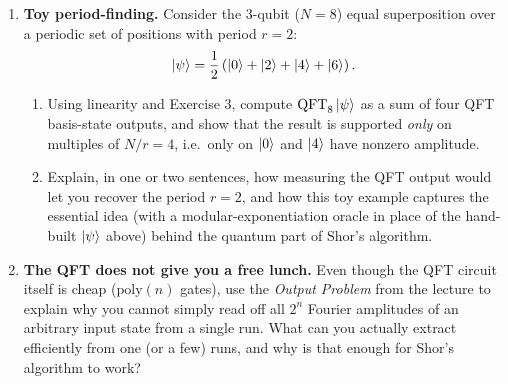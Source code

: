 \documentclass[11pt]{article}
\begin{document}
\begin{enumerate}[label=\textbf{Exercise \arabic*.}, leftmargin=2.2cm]
\item \textbf{Toy period-finding.}
Consider the 3-qubit ($N=8$) equal superposition over a periodic set of
positions with period $r=2$:
\[
\ket\psi = \frac12\left(\ket0+\ket2+\ket4+\ket6\right).
\]
\begin{enumerate}[label=(\alph*)]
\item Using linearity and Exercise 3, compute $\mathrm{QFT}_8\ket\psi$
as a sum of four QFT basis-state outputs, and show that the result is
supported \emph{only} on multiples of $N/r = 4$, i.e.\ only on $\ket0$
and $\ket4$ have nonzero amplitude.
\item Explain, in one or two sentences, how measuring the QFT output
would let you recover the period $r=2$, and how this toy example
captures the essential idea (with a modular-exponentiation oracle in
place of the hand-built $\ket\psi$ above) behind the quantum part of
Shor's algorithm.
\end{enumerate}

\item \textbf{The QFT does not give you a free lunch.}
Even though the QFT circuit itself is cheap ($\mathrm{poly}(n)$ gates),
use the \emph{Output Problem} from the lecture to explain why you
cannot simply read off all $2^n$ Fourier amplitudes of an arbitrary
input state from a single run. What can you actually extract
efficiently from one (or a few) runs, and why is that enough for
Shor's algorithm to work?

\end{enumerate}
\end{document}
